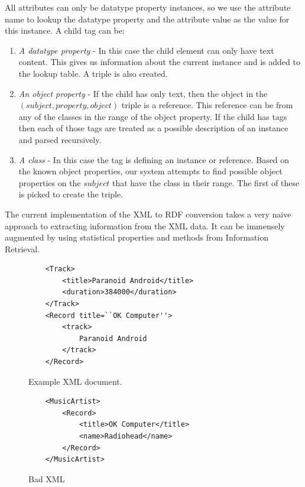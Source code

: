 \documentclass[journal]{IEEEtran}
\begin{document}
All attributes can only be datatype property instances, so we use the attribute
name to lookup the datatype property and the attribute value as the value for
this instance. A child tag can be:
\begin{enumerate}
    \item \emph{A datatype property} - In this case the child element can only
        have text content. This gives us information about the current instance
        and is added to the lookup table. A triple is also created.
    \item \emph{An object property} - If the child has only text, then the
        object in the $(subject, property, object)$ triple is a reference. This
        reference can be from any of the classes in the range of the object
        property. If the child has tags then each of those tags are treated as
        a possible description of an instance and parsed recursively.
    \item \emph{A class} - In this case the tag is defining an instance or
        reference. Based on the known object properties, our system attempts to
        find possible object properties on the $subject$ that have the class in
        their range. The first of these is picked to create the triple.
\end{enumerate}

The current implementation of the XML to RDF conversion takes a very naive
approach to extracting information from the XML data. It can be immensely
augmented by using statistical properties and methods from Information
Retrieval.

\begin{figure}
    \caption{Example XML document.}
    \label{ex:xml-rec}
    \begin{verbatim}
    <Track>
        <title>Paranoid Android</title>
        <duration>384000</duration>
    </Track>
    <Record title=``OK Computer''>
        <track>
            Paranoid Android
        </track>
    </Record>
    \end{verbatim}
\end{figure}

\begin{figure}
    \caption{Bad XML}
    \label{ex:xml-bad}
    \begin{verbatim}
    <MusicArtist>
        <Record>
            <title>OK Computer</title>
            <name>Radiohead</name>
        </Record>
    </MusicArtist>
    \end{verbatim}
\end{figure}
\end{document}
